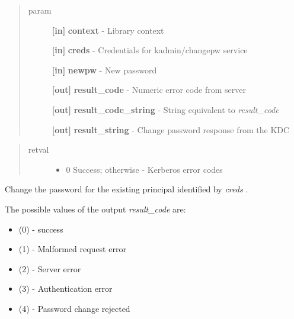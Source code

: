 \documentclass[letterpaper,10pt,english]{sphinxmanual}
\begin{document}
\begin{quote}\begin{description}
\item[{param}] \leavevmode
\textbf{{[}in{]}} \textbf{context} - Library context

\textbf{{[}in{]}} \textbf{creds} - Credentials for kadmin/changepw service

\textbf{{[}in{]}} \textbf{newpw} - New password

\textbf{{[}out{]}} \textbf{result\_code} - Numeric error code from server

\textbf{{[}out{]}} \textbf{result\_code\_string} - String equivalent to \emph{result\_code}

\textbf{{[}out{]}} \textbf{result\_string} - Change password response from the KDC

\end{description}\end{quote}
\begin{quote}\begin{description}
\item[{retval}] \leavevmode\begin{itemize}
\item {} 
0   Success; otherwise - Kerberos error codes

\end{itemize}

\end{description}\end{quote}

Change the password for the existing principal identified by \emph{creds} .

The possible values of the output \emph{result\_code} are:
\begin{itemize}
\item {} 
{\hyperref[appdev/refs/macros/KRB5_KPASSWD_SUCCESS:KRB5_KPASSWD_SUCCESS]{}} (0) - success

\item {} 
{\hyperref[appdev/refs/macros/KRB5_KPASSWD_MALFORMED:KRB5_KPASSWD_MALFORMED]{}} (1) - Malformed request error

\item {} 
{\hyperref[appdev/refs/macros/KRB5_KPASSWD_HARDERROR:KRB5_KPASSWD_HARDERROR]{}} (2) - Server error

\item {} 
{\hyperref[appdev/refs/macros/KRB5_KPASSWD_AUTHERROR:KRB5_KPASSWD_AUTHERROR]{}} (3) - Authentication error

\item {} 
{\hyperref[appdev/refs/macros/KRB5_KPASSWD_SOFTERROR:KRB5_KPASSWD_SOFTERROR]{}} (4) - Password change rejected

\end{itemize}
\end{document}
